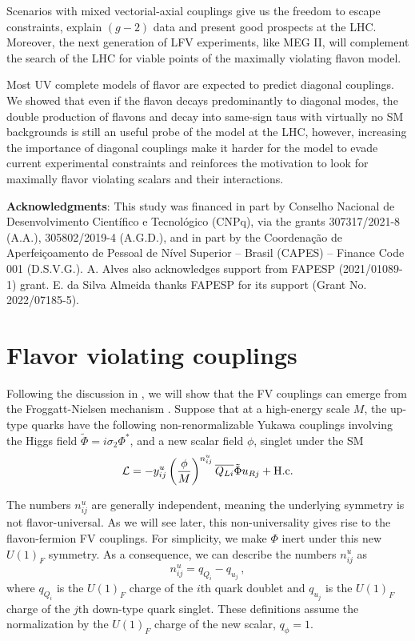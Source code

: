 \documentclass[prd,amsfonts,onecolumn,superscriptaddress,aps,nofootinbib,11pt]{revtex4-1}
\begin{document}
 Scenarios with mixed vectorial-axial couplings give us the freedom to escape constraints, explain $(g-2)$ data and present good prospects at the LHC. Moreover, the next generation of LFV experiments, like MEG II, will complement the search of the LHC for viable points of the maximally violating flavon model. 

Most UV complete models of flavor are expected to predict diagonal couplings. We showed that even if the flavon decays predominantly to diagonal modes, the double production of flavons and decay into same-sign taus with virtually no SM backgrounds is still an useful probe of the model at the LHC, however, increasing the importance of diagonal couplings make it harder for the model to evade current experimental constraints and reinforces the motivation to look for maximally flavor violating scalars and their interactions.
	
\bigskip{}
	
\textbf{Acknowledgments}: This study was financed in part by Conselho Nacional de Desenvolvimento Científico e Tecnológico (CNPq), via the grants 307317/2021-8 (A.A.), 305802/2019-4 (A.G.D.), and in part by the Coordenação de Aperfeiçoamento de Pessoal de Nível Superior – Brasil (CAPES) – Finance Code 001 (D.S.V.G.). A. Alves also acknowledges support from FAPESP (2021/01089-1) grant. E. da Silva Almeida thanks FAPESP for  its  support  (Grant  No.  2022/07185-5).
	

\appendix


\section{Flavor violating couplings}
\label{app:couplings}

Following the discussion in \cite{Ema:2016ops}, we will show that the FV couplings can emerge from the Froggatt-Nielsen mechanism \cite{Froggatt:1978nt}. Suppose that at a high-energy scale $M$, the up-type quarks have the following non-renormalizable Yukawa couplings involving the Higgs field $\tilde{\Phi} = i  \sigma_2 \Phi^*$, and a new scalar field $\phi$, singlet under the SM
\begin{equation}\label{eq:yuk}
    \mathcal{L} = -y^u_{ij} \left( \frac{\phi}{M} \right)^{n_{ij}^u} \overline{Q_{Li}} \tilde{\Phi} u_{Rj} + \rm{H.c.}
\end{equation}

The numbers $n_{ij}^u$ are generally independent, meaning the underlying symmetry is not flavor-universal. As we will see later, this non-universality gives rise to the flavon-fermion FV couplings. For simplicity, we make $\Phi$ inert under this new $U(1)_F$ symmetry. As a consequence, we can describe the numbers $n_{ij}^u$ as
\begin{equation}\label{eq:n}
    n_{ij}^u = q_{Q_i} - q_{u_j} \,,
\end{equation}
where $q_{Q_i}$ is the $U(1)_F$ charge of the $i$th quark doublet and $q_{u_j}$ is the $U(1)_F$ charge of the $j$th down-type quark singlet. These definitions assume the normalization by the $U(1)_F$ charge of the new scalar, $q_\phi = 1$.
\end{document}
